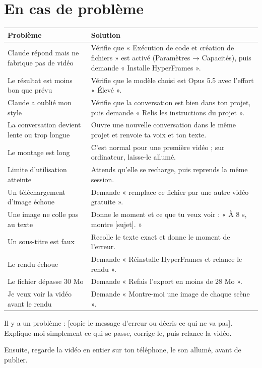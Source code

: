 \documentclass[11pt,oneside,openany]{book}
\begin{document}
\chapter*{En cas de problème}
\renewcommand{\arraystretch}{1.15}
{\footnotesize
\begin{xltabular}{\linewidth}{>{\raggedright\arraybackslash}p{3.2cm}>{\raggedright\arraybackslash}X}
\toprule
\textbf{Problème} & \textbf{Solution} \\ \midrule
Claude répond mais ne fabrique pas de vidéo & Vérifie que « Exécution de code et création de fichiers » est activé (Paramètres → Capacités), puis demande « Installe HyperFrames ». \\
Le résultat est moins bon que prévu & Vérifie que le modèle choisi est Opus 5.5 avec l'effort « Élevé ». \\
Claude a oublié mon style & Vérifie que la conversation est bien dans ton projet, puis demande « Relis les instructions du projet ». \\
La conversation devient lente ou trop longue & Ouvre une nouvelle conversation dans le même projet et renvoie ta voix et ton texte. \\
Le montage est long & C'est normal pour une première vidéo ; sur ordinateur, laisse-le allumé. \\
Limite d'utilisation atteinte & Attends qu'elle se recharge, puis reprends la même session. \\
Un téléchargement d'image échoue & Demande « remplace ce fichier par une autre vidéo gratuite ». \\
Une image ne colle pas au texte & Donne le moment et ce que tu veux voir : « À 8 s, montre [sujet]. » \\
Un sous-titre est faux & Recolle le texte exact et donne le moment de l'erreur. \\
Le rendu échoue & Demande « Réinstalle HyperFrames et relance le rendu ». \\
Le fichier dépasse 30 Mo & Demande « Refais l'export en moins de 28 Mo ». \\
Je veux voir la vidéo avant le rendu & Demande « Montre-moi une image de chaque scène ». \\ \bottomrule
\end{xltabular}}

\begin{acopier}
Il y a un problème : [copie le message d'erreur ou décris ce qui ne va pas]. Explique-moi simplement ce qui se passe, corrige-le, puis relance la vidéo.
\end{acopier}
Ensuite, regarde la vidéo en entier sur ton téléphone, le son allumé, avant de publier.
\end{document}
